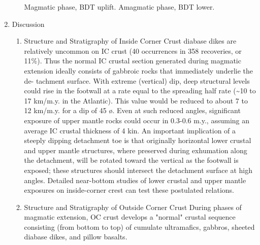 \documentclass[11pt]{article}
\begin{document}
\begin{enumerate}
\begin{enumerate}
Magmatic phase, BDT uplift.
Amagmatic phase, BDT lower.
\end{enumerate}
\item Discussion
\label{sec-1-1-2-7}
\begin{enumerate}
\item Structure and Stratigraphy of Inside Corner Crust
\label{sec-1-1-2-7-1}
diabase dikes are relatively uncommon on IC crust (40 occurrences in 358 recoveries, or 11\%). Thus the normal IC crustal section generated during magmatic extension ideally consists of gabbroic rocks that immediately underlie the de- tachment surface.
 With extreme (vertical) dip, deep structural levels could rise in the footwall at a rate equal to the spreading half rate (\textasciitilde{}10 to 17 km/m.y. in the Atlantic). This value would be reduced to about 7 to 12 km/m.y. for a dip of 45 ø. Even at such reduced angles, significant exposure of upper mantle rocks could occur in 0.3-0.6 m.y., assuming an average IC crustal thickness of 4 kin.
An important implication of a steeply dipping detachment toe is that originally horizontal lower crustal and upper mantle structures, where preserved during exhumation along the detachment, will be rotated toward the vertical as the footwall is exposed; these structures should intersect the detachment surface at high angles. Detailed near-bottom studies of lower crustal and upper mantle exposures on inside-corner crest can test these postulated relations.
\item Structure and Stratigraphy of Outside Corner Crust
\label{sec-1-1-2-7-2}
During phases of magmatic extension, OC crust develops a "normal" crustal sequence consisting (from bottom to top) of cumulate ultramafics, gabbros, sheeted diabase dikes, and pillow basalts.

\end{enumerate}
\end{enumerate}
\end{document}
